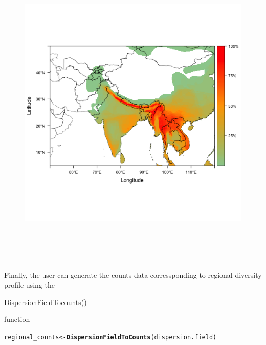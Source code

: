 \documentclass[12pt]{article}\usepackage[]{graphicx}\usepackage[usenames,dvipsnames]{color}
\makeatletter
\newcommand{\hlstd}[1]{\textcolor[rgb]{0.345,0.345,0.345}{#1}}%
\newcommand{\hlkwb}[1]{\textcolor[rgb]{0.69,0.353,0.396}{#1}}%
\newcommand{\hlkwd}[1]{\textcolor[rgb]{0.737,0.353,0.396}{\textbf{#1}}}%
\newenvironment{kframe}{%
 \def\at@end@of@kframe{}%
 \ifinner\ifhmode%
  \def\at@end@of@kframe{\end{minipage}}%
  \begin{minipage}{\columnwidth}%
 \fi\fi%
 \def\FrameCommand##1{\hskip\@totalleftmargin \hskip-\fboxsep
 \colorbox{shadecolor}{##1}\hskip-\fboxsep
     \hskip-\linewidth \hskip-\@totalleftmargin \hskip\columnwidth}%
 \MakeFramed {\advance\hsize-\width
   \@totalleftmargin\z@ \linewidth\hsize
   \@setminipage}}%
 {\par\unskip\endMakeFramed%
 \at@end@of@kframe}
\newenvironment{knitrout}{}{} %
\makeatother
\begin{document}
\begin{figure}[htp]
\begin{center}
\includegraphics[width=6in,height=6in]{figure/plot_map-1.png}
\end{center}
\end{figure}


Finally, the user can generate the counts data corressponding to regional diversity profile using the \\
\begin{verb} DispersionFieldTocounts() \end{verb} function

\begin{knitrout}
\color{fgcolor}\begin{kframe}
\begin{alltt}
\hlstd{regional_counts} \hlkwb{<-} \hlkwd{DispersionFieldToCounts}\hlstd{(dispersion.field)}
\end{alltt}
\end{kframe}
\end{knitrout}
\end{document}
